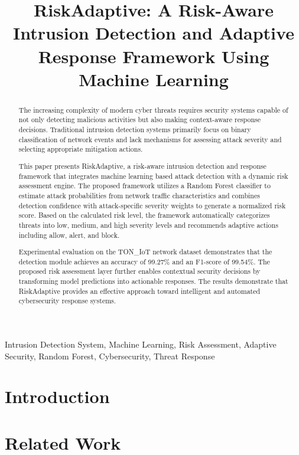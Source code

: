 \documentclass[conference]{IEEEtran}
\title{RiskAdaptive: A Risk-Aware Intrusion Detection and Adaptive Response Framework Using Machine Learning}
\author{
\IEEEauthorblockN{Utkarsh Sharma}
\IEEEauthorblockA{
Department of Computer Science and Engineering\\
Chandigarh University\\
India
}
}
\begin{document}
\maketitle


\begin{abstract}

The increasing complexity of modern cyber threats requires security systems capable of not only detecting malicious activities but also making context-aware response decisions. Traditional intrusion detection systems primarily focus on binary classification of network events and lack mechanisms for assessing attack severity and selecting appropriate mitigation actions.

This paper presents RiskAdaptive, a risk-aware intrusion detection and response framework that integrates machine learning based attack detection with a dynamic risk assessment engine. The proposed framework utilizes a Random Forest classifier to estimate attack probabilities from network traffic characteristics and combines detection confidence with attack-specific severity weights to generate a normalized risk score. Based on the calculated risk level, the framework automatically categorizes threats into low, medium, and high severity levels and recommends adaptive actions including allow, alert, and block.

Experimental evaluation on the TON_IoT network dataset demonstrates that the detection module achieves an accuracy of 99.27\% and an F1-score of 99.54\%. The proposed risk assessment layer further enables contextual security decisions by transforming model predictions into actionable responses. The results demonstrate that RiskAdaptive provides an effective approach toward intelligent and automated cybersecurity response systems.

\end{abstract}


\begin{IEEEkeywords}

Intrusion Detection System, Machine Learning, Risk Assessment, Adaptive Security, Random Forest, Cybersecurity, Threat Response

\end{IEEEkeywords}


\section{Introduction}


\section{Related Work}
\end{document}
